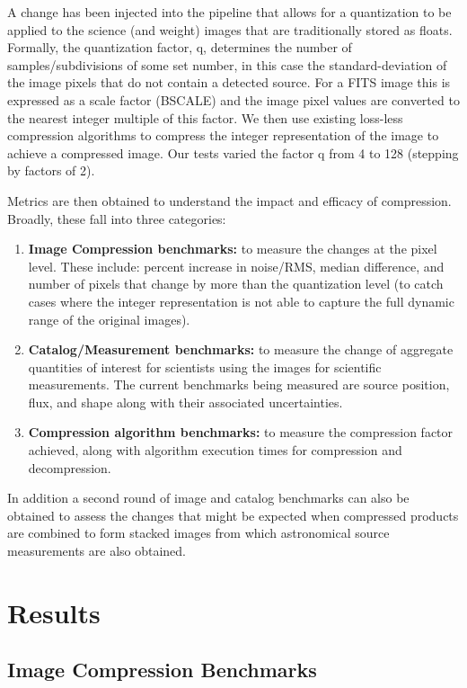 A change has been injected into the pipeline that allows for a quantization to be applied
to the science (and weight) images that are traditionally stored as floats.  Formally,
the quantization factor, q, determines the number of samples/subdivisions of some set
number, in this case the standard-deviation of the image pixels that do not contain a 
detected source.  For a FITS image this is expressed as a scale factor (BSCALE) and the image 
pixel values are converted to the nearest integer multiple of this factor.  We then use existing
loss-less compression algorithms to compress the integer representation of the image
to achieve a compressed image.  Our tests varied the factor q from 4 to 128 (stepping by 
factors of 2).

Metrics are then obtained to understand the impact and efficacy of compression.  Broadly, 
these fall into three categories:
\begin{enumerate}
\item {\bf Image Compression benchmarks:} to measure the changes at the pixel level.  These
include: percent increase in noise/RMS, median difference, and number of pixels that change
by more than the quantization level (to catch cases where the integer representation is not 
able to capture the full dynamic range of the original images).

\item {\bf Catalog/Measurement benchmarks:} to measure the change of aggregate quantities
of interest for scientists using the images for scientific measurements.  The current
benchmarks being measured are source position, flux, and shape along with their associated
uncertainties.

\item {\bf Compression algorithm benchmarks:} to measure the compression factor achieved, along with
algorithm execution times for compression and decompression.
\end{enumerate}
In addition a second round of image and catalog benchmarks can also be obtained to assess
the changes that might be expected when compressed products are combined to form stacked
images from which astronomical source measurements are also obtained.


\section{Results}

\subsection{Image Compression Benchmarks}

